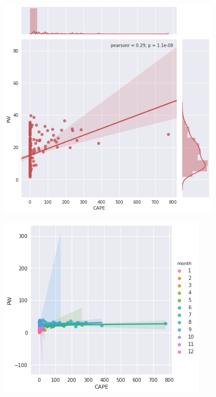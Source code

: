 \documentclass{article}
\begin{document}
\begin{figure}
  \includegraphics[width=\linewidth]{capepw.png}
\end{figure}
\begin{figure}
  \includegraphics[width=\linewidth]{capepwcolor.png}
\end{figure}
\end{document}
